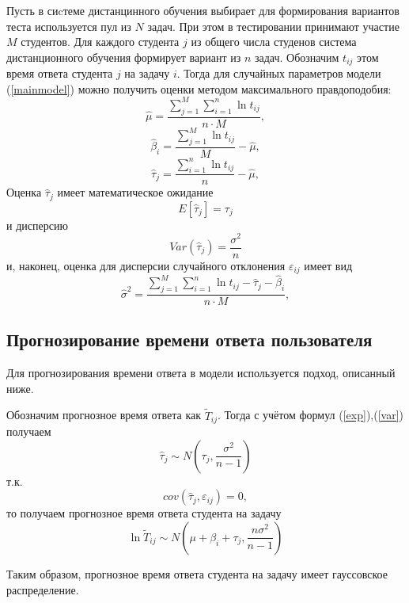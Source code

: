 Пусть в сиcтеме дистанцинного обучения выбирает для формирования вариантов теста используется пул из $N$ задач. При этом в тестировании принимают участие $M$ студентов. Для каждого студента $j$ из общего числа студенов система дистанционного обучения формирует вариант из $n$ задач. Обозначим $t_{ij}$ этом время ответа студента $j$ на задачу $i$. Тогда для случайных параметров модели (\ref{mainmodel}) можно получить оценки методом макси\-мального правдоподобия:
\begin{equation}
\hat{\mu} = \frac{\sum\limits_{j=1}^{M}\sum\limits_{i=1}^{n}\ln t_{ij}}{n \cdot M},
\end{equation}
\begin{equation}
\hat{\beta}_i = \frac{\sum\limits_{j=1}^{M}\ln t_{ij}}{M} - \hat{\mu},
\end{equation}
\begin{equation}
\hat{\tau}_j = \frac{\sum\limits_{i=1}^{n}\ln t_{ij}}{n} - \hat{\mu},
\end{equation}
Оценка $\hat{\tau}_j$ имеет математическое ожидание
\begin{equation}
\label{exp}
E[\hat{\tau}_j] = \tau_j
\end{equation}
и дисперсию
\begin{equation}
\label{var}
Var(\hat{\tau}_j) = \frac{\sigma^2}{n}
\end{equation}
и, наконец, оценка для дисперсии случайного отклонения $\varepsilon_{ij}$ имеет вид
\begin{equation}
\hat{\sigma}^2 = \frac{\sum\limits_{j=1}^{M}\sum\limits_{i=1}^{n}\ln t_{ij} - \hat{\tau}_j - \hat{\beta}_i}{n \cdot M},
\end{equation}

\subsection{Прогнозирование времени ответа пользователя}

Для прогнозирования времени ответа в модели используется подход, описанный ниже.

Обозначим прогнозное время ответа как $\tilde{T}_{ij}$. Тогда с учётом формул (\ref{exp}),(\ref{var}) получаем
\begin{equation}
\hat{\tau}_j \sim N\left(\tau_j, \frac{\sigma^2}{n-1}\right)
\end{equation}
т.к.
\begin{equation}
cov(\hat{\tau}_j,\varepsilon_{ij}) = 0,
\end{equation}
то получаем прогнозное время ответа студента на задачу
\begin{equation}
\label{predictedtime}
\ln \tilde{T}_{ij} \sim N\left(\mu + \beta_i + \tau_j,\frac{n\sigma^2}{n-1}\right)
\end{equation}

Таким образом, прогнозное время ответа студента на задачу имеет гауссовское\\ распределение.